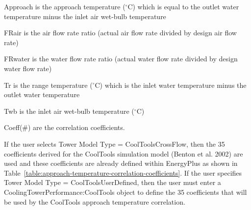Approach is the approach temperature (\(^{\circ}\)C) which is equal to the outlet water temperature minus the inlet air wet-bulb temperature

FRair is the air flow rate ratio (actual air flow rate divided by design air flow rate)

FRwater is the water flow rate ratio (actual water flow rate divided by design water flow rate)

Tr is the range temperature (\(^{\circ}\)C) which is the inlet water temperature minus the outlet water temperature

Twb is the inlet air wet-bulb temperature (\(^{\circ}\)C)

Coeff(\#) are the correlation coefficients.

If the user selects Tower Model Type = CoolToolsCrossFlow, then the 35 coefficients derived for the CoolTools simulation model (Benton et al. 2002) are used and these coefficients are already defined within EnergyPlus as shown in Table~\ref{table:approach-temperature-correlation-coefficients}. If the user specifies Tower Model Type = CoolToolsUserDefined, then the user must enter a CoolingTowerPerformance:CoolTools object to define the 35 coefficients that will be used by the CoolTools approach temperature correlation.

